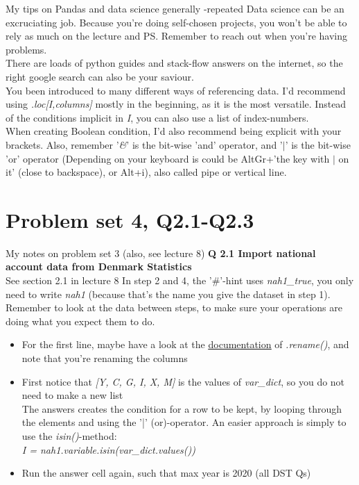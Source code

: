 \documentclass[10pt,danish,t,10pt]{beamer}
\newcommand{\code}[1]{\textit{#1}} %
\begin{document}
\begin{frame}{My tips on Pandas and data science generally -repeated}
    Data science can be an excruciating job. Because you're doing self-chosen projects, you won't be able to rely as much on the lecture and PS. Remember to reach out when you're having problems.\\
    There are loads of python guides and stack-flow answers on the internet, so the right google search can also be your saviour. \\
    You been introduced to many different ways of referencing data. I'd recommend using \code{.loc[I,columns]} mostly in the beginning, as it is the most versatile. Instead of the conditions implicit in \code{I}, you can also use a list of index-numbers. \\
    When creating Boolean condition, I'd also recommend being explicit with your brackets. Also, remember '\code{\&}' is the bit-wise 'and' operator, and '$\vert$' is the bit-wise 'or' operator (Depending on your keyboard is could be AltGr+'the key with $\vert$ on it' (close to backspace), or Alt+i), also called pipe or vertical line.
\end{frame}



\section{Problem set 4, Q2.1-Q2.3}

\begin{frame}{My notes on problem set 3 (also, see lecture 8)}
\textbf{Q 2.1 Import national account data from Denmark Statistics} \\
See section 2.1 in lecture 8 \newline
In step 2 and 4, the '\#'-hint uses \code{nah1\_true}, you only need to write \code{nah1} (because that's the name you give the dataset in step 1). \newline
Remember to look at the data between steps, to make sure your operations are doing what you expect them to do.
\begin{itemize}
    \item[Step 2] For the first line, maybe have a look at the \href{https://pandas.pydata.org/pandas-docs/stable/reference/api/pandas.DataFrame.rename.html}{\underline{documentation}} of \code{.rename()}, and note that you're renaming the columns\\
    \item[Step 3] First notice that \code{[Y, C, G, I, X, M]} is the values of \code{var\_dict}, so you do not need to make a new list \\
    The answers creates the condition for a row to be kept, by looping through the elements and using the '|' (or)-operator. An easier approach is simply to use the \code{isin()}-method: \\ \code{I = nah1.variable.isin(var\_dict.values())}
    \item[Step 4] Run the answer cell again, such that max year is 2020 (all DST Qs)
\end{itemize}
\end{frame}
\end{document}
